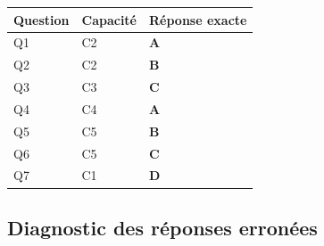 \begin{center}
\begin{tabular}{lll}
\hline
Question & Capacité & Réponse exacte \\
\hline
Q1 & C2 & \textbf{A} \\
Q2 & C2 & \textbf{B} \\
Q3 & C3 & \textbf{C} \\
Q4 & C4 & \textbf{A} \\
Q5 & C5 & \textbf{B} \\
Q6 & C5 & \textbf{C} \\
Q7 & C1 & \textbf{D} \\
\hline
\end{tabular}
\end{center}

\subsection*{Diagnostic des réponses erronées}

